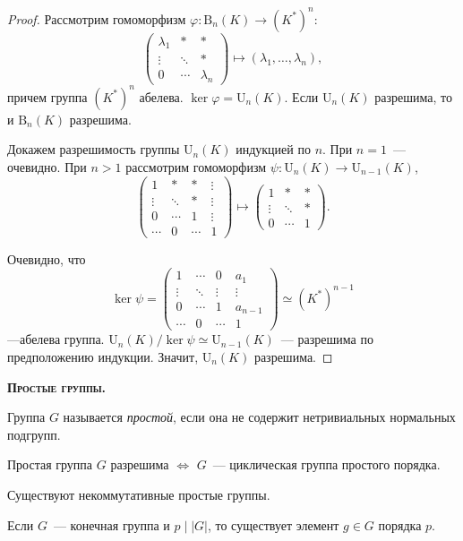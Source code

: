\documentclass[a4paper]{article}
\newcommand*{\tema}[1]{\vspace{20pt}
\begin{center}{\textbf{\textsc{#1.}}}\vspace{5pt}
\end{center}}
\begin{document}
\begin{proof}
Рассмотрим гомоморфизм $\varphi\colon \mathrm{B}_n(K)\to (K^*)^n$:
$$
\begin{pmatrix}
\lambda_1 &* &* \\
\vdots& \ddots & *\\
0&\cdots & \lambda_n
\end{pmatrix}\mapsto (\lambda_1,\ldots,\lambda_n),
$$
причем группа $(K^*)^n$ абелева. $\ker\varphi=\mathrm{U}_n(K)$. Если
$\mathrm{U}_n(K)$ разрешима, то и $\mathrm{B}_n(K)$ разрешима.

Докажем разрешимость группы $\mathrm{U}_n(K)$ индукцией по $n$. При
$n=1$~--- очевидно. При $n>1$ рассмотрим гомоморфизм $\psi\colon
\mathrm{U}_n(K)\to \mathrm{U}_{n-1}(K)$,
$$
\begin{pmatrix}
1 &* &* &\vdots\\
\vdots& \ddots & *&\vdots\\
0&\cdots & 1&\vdots\\
\cdots& 0 &\cdots & 1
\end{pmatrix}\mapsto
\begin{pmatrix}
1 &* &* \\
\vdots& \ddots & *\\
0&\cdots & 1
\end{pmatrix}.$$

Очевидно, что
$$\ker\psi=
\begin{pmatrix}
1 &\cdots &0 &a_1\\
\vdots& \ddots & \vdots&\vdots\\
0&\cdots & 1&a_{n-1}\\
\cdots& 0 &\cdots & 1
\end{pmatrix}\simeq (K^*)^{n-1}
$$
---абелева группа. $\mathrm{U}_n(K)/\ker\psi\simeq \mathrm{U}_{n-1}(K)$~--- разрешима
по предположению индукции. Значит, $\mathrm{U}_n(K)$ разрешима.
\end{proof}

\tema{Простые группы}

Группа $G$ называется \emph{простой}, если она не содержит
нетривиальных нормальных подгрупп.

Простая группа $G$ разрешима $\Leftrightarrow$ $G$~--- циклическая
группа простого порядка.

Существуют некоммутативные простые группы.

\begin{lemma}
\label{1.X}Если $G$~--- конечная группа и $p\mid|G|$, то существует
элемент $g\in G$ порядка $p$.
\end{lemma}
\end{document}

